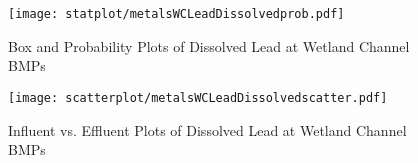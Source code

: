         \begin{figure}[hb]   %
            \centering
            \texttt{[image: statplot/metalsWCLeadDissolvedprob.pdf]}
            \caption{Box and Probability Plots of Dissolved Lead at Wetland Channel BMPs}
        \end{figure}         %
        
        
        \begin{figure}[hb]   %
            \centering
            \texttt{[image: scatterplot/metalsWCLeadDissolvedscatter.pdf]}
            \caption{Influent vs. Effluent Plots of Dissolved Lead at Wetland Channel BMPs}
        \end{figure}         %
        \clearpage
        